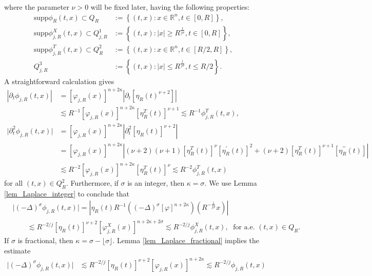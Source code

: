 \documentclass[11pt,reqno]{amsart}
\newcommand{\tron}[1]{\left( #1 \right)}
\numberwithin{equation}{section}
\newcommand{\flo}[1]{\lfloor #1 \rfloor }
\begin{document}
where the parameter $\nu>0$ will be fixed later, having the following properties:
\begin{equation}\label{domain}
\begin{aligned}
\text{supp}\phi_R(t,x)\subset Q_R&:=\left\{(t,x):x\in \mathbb{R}^n,t\in[0,R]\right\},\\
\text{supp}\phi^{X}_{j,R}(t,x)\subset Q^1_{j,R}&:=\left\{(t,x):|x|\geq R^{\frac{1}{j\sigma}},t\in [0,R]\right\},\\
\text{supp}\phi^{T}_{j,R}(t,x)\subset Q^2_{R}&:=\left\{(t,x):x\in \mathbb{R}^n,t\in\left[R/2,R\right]\right\},\\
Q^3_{j,R}&:=\left\{(t,x):|x|\leq R^{\frac{1}{j\sigma}},t\leq R/2\right\}.
\end{aligned}
\end{equation}
A straightforward calculation gives
\begin{align}
|\partial_t \phi_{j,R}(t,x)| &=[\varphi_{j,R}(x)]^{n+2\kappa}\left|\partial_t[\eta_R(t)^{\nu+2}]\right| \nonumber \\
&\lesssim R^{-1}[\varphi_{j,R}(x)]^{n+2\kappa}[\eta^{T}_R(t)]^{\nu+1} \lesssim R^{-1}\phi^{T}_{j,R}(t,x), \label{testfunceq1} \\
\big|\partial^2_t\phi_{j,R}(t,x)\big|&=[\varphi_{j,R}(x)]^{n+2\kappa}\left|\partial^2_t[\eta_R(t)]^{\nu+2}\right|\nonumber\\
&=[\varphi_{j,R}(x)]^{n+2\kappa}\left|(\nu+2)(\nu+1)[\eta^{T}_R(t)]^{\nu}[\eta^{\prime}_R(t)]^2+(\nu+2)[\eta^{T}_R(t)]^{\nu+1}[\eta^{\prime\prime}_R(t)]\right|\nonumber\\
&\lesssim R^{-2}[\varphi_{j,R}(x)]^{n+2\kappa}[\eta^{T}_R(t)]^{\nu}\lesssim R^{-2}\phi^{T}_{j,R}(t,x) \label{testfunceq2}
\end{align}
for all $(t,x)\in Q^2_R$. Furthermore, if $\sigma$ is an integer, then $\kappa=\sigma$. We use Lemma \ref{lem_Laplace_integer} to conclude that
\begin{align}
&\big|(-\Delta)^{\sigma} \phi_{j,R}(t,x)\big|=\left|\eta_R(t)R^{-1}((-\Delta)^{\sigma}[\varphi]^{n+2\kappa})\tron{R^{-\frac{1}{j\sigma}}x}\right|\nonumber\\
&\qquad\lesssim R^{-2/j}[\eta_R(t)]^{\nu+2}[\varphi^{X}_{j,R}(x)]^{n+2\kappa+2\sigma}\lesssim R^{-2/j}\phi^{X}_{j,R}(t,x),\;\text{ for a.e. } (t,x)\in Q_R.\label{testfunceq3_integer}
\end{align}
If $\sigma$ is fractional, then $\kappa=\sigma-\flo{\sigma}$. Lemma \ref{lem_Laplace_fractional} implies the estimate
\begin{align}\label{testfunceq3_fractional}
\big|(-\Delta)^{\sigma} \phi_{j,R}(t,x)\big|&\lesssim R^{-2/j}[\eta_R(t)]^{\nu+2}[\varphi_{j,R}(x)]^{n+2\kappa} \lesssim R^{-2/j}\phi_{j,R}(t,x)
\end{align}
\end{document}
